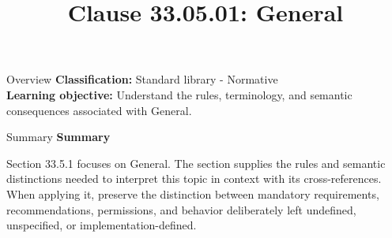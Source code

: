 \documentclass[10pt,letterpaper]{article}
\title{Clause 33.05.01: General}
\author{}
\date{}
\begin{document}
\maketitle
\begin{CornellOverviewBox}{Overview}
\textbf{Classification:} Standard library - Normative\\[2pt]
\textbf{Learning objective:} Understand the rules, terminology, and semantic consequences associated with General.
\end{CornellOverviewBox}\begin{CornellSummaryBox}{Summary}
{\sffamily\bfseries\color{Accent} Summary}\par\vspace{3pt}Section 33.5.1 focuses on General. The section supplies the rules and semantic distinctions needed to interpret this topic in context with its cross-references. When applying it, preserve the distinction between mandatory requirements, recommendations, permissions, and behavior deliberately left undefined, unspecified, or implementation-defined.
\end{CornellSummaryBox}
\end{document}

